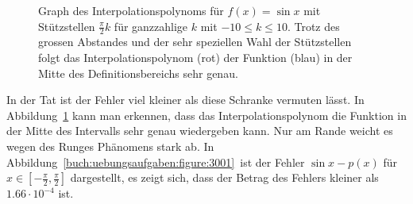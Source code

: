 \begin{loesung}
\begin{figure}
\caption{Graph des Interpolationspolynoms für $f(x)=\sin x$ mit Stützstellen
$\frac{\pi}2k$ für ganzzahlige $k$ mit $-10\le k\le 10$.
Trotz des grossen Abstandes und der sehr speziellen Wahl der Stützstellen 
folgt das Interpolationspolynom (rot) der Funktion (blau) in der Mitte des
Definitionsbereichs sehr genau.
\label{buch:uebungsaufgaben:figure:3001plot}}
\end{figure}%
In der Tat ist der Fehler viel kleiner als diese Schranke vermuten lässt.
In Abbildung~\ref{buch:uebungsaufgaben:figure:3001plot} kann man
erkennen, dass das Interpolationspolynom die Funktion in der Mitte
des Intervalls sehr genau wiedergeben kann.
Nur am Rande weicht es wegen des Runges Phänomens stark ab.
%
In Abbildung~\ref{buch:uebungsaufgaben:figure:3001} ist der Fehler
$\sin x -p(x)$ für $x\in[-\frac{\pi}2,\frac{\pi}2]$ dargestellt, es zeigt
sich, dass der Betrag des Fehlers kleiner als $1.66\cdot 10^{-4}$ ist.
\end{loesung}

